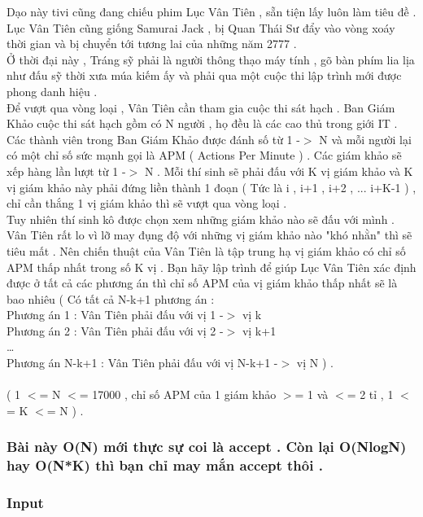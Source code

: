 



   Dạo này tivi cũng đang chiếu phim Lục Vân Tiên , sẵn tiện lấy luôn làm tiêu đề .   
\\   Lục Vân Tiên cũng giống Samurai Jack , bị Quan Thái Sư đẩy vào vòng xoáy thời gian và bị chuyển tới tương lai của những năm 2777 .   
\\   Ở thời đại này , Tráng sỹ phải là người thông thạo máy tính , gõ bàn phím lia lịa như đấu sỹ thời xưa múa kiếm ấy và phải qua một cuộc thi lập trình mới được phong danh hiệu .   
\\   Để vượt qua vòng loại , Vân Tiên cần tham gia cuộc thi sát hạch . Ban Giám Khảo cuộc thi sát hạch gồm có N người , họ đều là các cao thủ trong giới IT . Các thành viên trong Ban Giám Khảo được đánh số từ 1 -$>$ N và mỗi người lại có một chỉ số sức mạnh gọi là APM ( Actions Per Minute ) . Các giám khảo sẽ xếp hàng lần lượt từ 1 -$>$ N . Mỗi thí sinh sẽ phải đấu với K vị giám khảo và K vị giám khảo này phải đứng liền thành 1 đoạn ( Tức là i , i+1 , i+2 , ... i+K-1 ) , chỉ cần thắng 1 vị giám khảo thì sẽ vượt qua vòng loại .   
\\   Tuy nhiên thí sinh kô được chọn xem những giám khảo nào sẽ đấu với mình .   
\\   Vân Tiên rất lo vì lỡ may đụng độ với những vị giám khảo nào "khó nhằn" thì sẽ tiêu mất . Nên chiến thuật của Vân Tiên là tập trung hạ vị giám khảo có chỉ số APM thấp nhất trong số K vị . Bạn hãy lập trình để giúp Lục Vân Tiên xác định được ở tất cả các phương án thì chỉ số APM của vị giám khảo thấp nhất sẽ là bao nhiêu ( Có tất cả N-k+1 phương án :   
\\   Phương án 1 : Vân Tiên phải đấu với vị 1 -$>$ vị k   
\\   Phương án 2 : Vân Tiên phải đấu với vị 2 -$>$ vị k+1   
\\   …   
\\   Phương án N-k+1  : Vân Tiên phải đấu với vị N-k+1 -$>$ vị N ) .   
\\
\\   ( 1 $<$= N $<$= 17000 , chỉ số APM của 1 giám khảo $>$= 1 và $<$= 2 tỉ , 1 $<$= K $<$= N ) .  

\subsubsection{   Bài này O(N) mới thực sự coi là accept . Còn lại O(NlogN) hay O(N*K) thì bạn chỉ may mắn accept thôi .  }

\subsubsection{   Input  }

